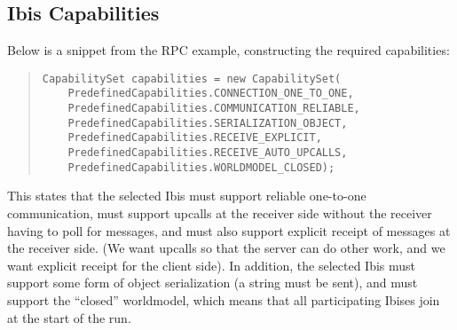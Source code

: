 \documentclass[10pt]{article}
\newcommand{\mysubsection}[1]{\subsection{#1}\label{#1}}
\begin{document}
\mysubsection{Ibis Capabilities}

Below is a snippet from the RPC example, constructing the required capabilities:
{\small
\begin{quote}
\begin{verbatim}
CapabilitySet capabilities = new CapabilitySet(
    PredefinedCapabilities.CONNECTION_ONE_TO_ONE,
    PredefinedCapabilities.COMMUNICATION_RELIABLE,
    PredefinedCapabilities.SERIALIZATION_OBJECT,
    PredefinedCapabilities.RECEIVE_EXPLICIT,
    PredefinedCapabilities.RECEIVE_AUTO_UPCALLS,
    PredefinedCapabilities.WORLDMODEL_CLOSED);
\end{verbatim}
\end{quote}
}
This states that the selected Ibis must support reliable one-to-one
communication, must support upcalls at the receiver side without the
receiver having to poll for messages, and must also support explicit
receipt of messages at the receiver side.
(We want upcalls so that the server can do other work, and we want
explicit receipt for the client side).
In addition, the selected Ibis must support some form of object
serialization (a string must be sent),
and must support the ``closed'' worldmodel, which means
that all participating Ibises join at the start of the run.
\end{document}
